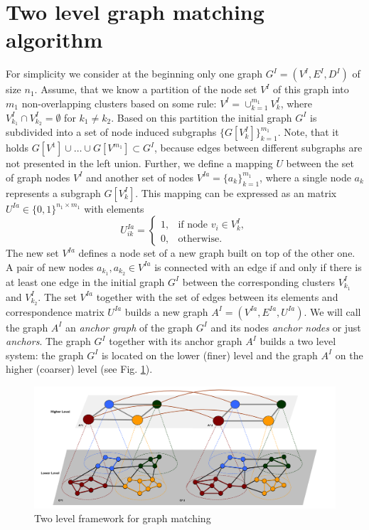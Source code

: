 \section{Two level graph matching algorithm}
For simplicity we consider at the beginning only one graph $G^I=(V^I,E^I,D^I)$ of size $n_1$. Assume, that we know a partition of the node set $V^I$ of this graph into $m_1$ non-overlapping clusters based on some rule: $V^I=\cup_{k=1}^{m_1}V^I_k$, where $V^I_{k_1}\cap V^I_{k_2}=\emptyset$ for $k_1\not=k_2$. Based on this partition the initial graph $G^I$ is subdivided into a set of node induced subgraphs $\{G[V^I_k]\}_{k=1}^{m_1}$. Note, that it holds $G[V^1]\cup\dots\cup G[V^{m_1}]\subset G^I$, because edges between different subgraphs are not presented in the left union.
Further, we define a mapping $U$ between the set of graph nodes $V^I$ and another set of nodes $V^{Ia}=\{a_k\}_{k=1}^{m_1}$, where a single node $a_k$ represents a subgraph  $G[V^I_k]$. This mapping can be expressed as an matrix $U^{Ia}\in\{0,1\}^{n_1\times m_1}$ with elements 
\begin{equation}\label{eq:matrixU}
U^{Ia}_{ik} = \begin{cases} 1, & \mbox{if node } v_i\in V^I_k,    \\
0, & \mbox{otherwise}.\end{cases}
\end{equation}
The new set $V^{Ia}$ defines a node set of a new graph built on top of the other one. A pair of new nodes $a_{k_1},a_{k_2}\in V^{Ia}$ is connected with an edge if and only if there is at least one edge in the initial graph $G^I$ between the corresponding clusters $V^I_{k_1}$ and $V^I_{k_2}$. The set $V^{Ia}$ together with the set of edges between its elements and correspondence matrix $U^{Ia}$ builds a new graph $A^I=(V^{Ia},E^{Ia},U^{Ia})$. We will call the graph $A^I$ an \emph{anchor graph} of the graph $G^I$ and its nodes \emph{anchor nodes} or just \emph{anchors}. The graph $G^I$ together with its anchor graph $A^I$ builds a two level system: the graph $G^I$ is located on the lower (finer) level and the graph $A^I$ on the higher (coarser) level (see Fig. \ref{fig:2levels}).

\begin{figure} [h!]
	\centering
	\includegraphics[scale=0.35]{chapter2/fig/twolevels3.pdf}
	\caption{Two level framework for graph matching} \label{fig:2levels}
\end{figure}

